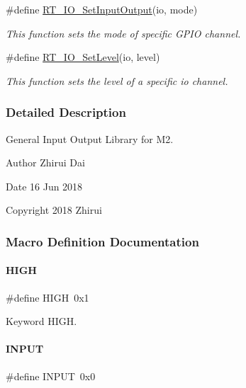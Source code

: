 \begin{DoxyCompactItemize}
$$\#define \mbox{\hyperlink{a00014_ae845dc41cbf1b32b4d576373d1866d65}{R\+T\+\_\+\+I\+O\+\_\+\+Set\+Input\+Output}}(io,  mode)
\begin{DoxyCompactList}\small\item\em This function sets the mode of specific G\+P\+IO channel. \end{DoxyCompactList}\item 
\#define \mbox{\hyperlink{a00014_a95fe40498ba314e1ea68aaa50335e7ef}{R\+T\+\_\+\+I\+O\+\_\+\+Set\+Level}}(io,  level)
\begin{DoxyCompactList}\small\item\em This function sets the level of a specific io channel. \end{DoxyCompactList}\end{DoxyCompactItemize}


\subsubsection{Detailed Description}
General Input Output Library for M2. 

\begin{DoxyAuthor}{Author}
Zhirui Dai 
\end{DoxyAuthor}
\begin{DoxyDate}{Date}
16 Jun 2018 
\end{DoxyDate}
\begin{DoxyCopyright}{Copyright}
2018 Zhirui 
\end{DoxyCopyright}


\subsubsection{Macro Definition Documentation}
\mbox{\label{a00014_a5bb885982ff66a2e0a0a45a8ee9c35e2}} 
\paragraph{\texorpdfstring{H\+I\+GH}{HIGH}}
{\footnotesize\ttfamily \#define H\+I\+GH~0x1}

Keyword H\+I\+GH. \mbox{\label{a00014_a1bb283bd7893b9855e2f23013891fc82}} 
\paragraph{\texorpdfstring{I\+N\+P\+UT}{INPUT}}
{\footnotesize\ttfamily \#define I\+N\+P\+UT~0x0}


